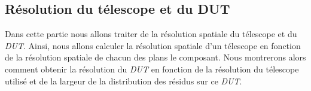      
     
     

  \subsection{R\'esolution du t\'elescope et du DUT}
  
  Dans cette partie nous allons traiter de la r\'esolution spatiale du t\'elescope et du \textit{DUT}. Ainsi, nous allons calculer la r\'esolution spatiale d'un t\'elescope en fonction de la r\'esolution spatiale de chacun des plans le composant. Nous montrerons alors comment obtenir la r\'esolution du \textit{DUT} en fonction de la r\'esolution du t\'elescope utilis\'e et de la largeur de la distribution des r\'esidus sur ce \textit{DUT}.
  
